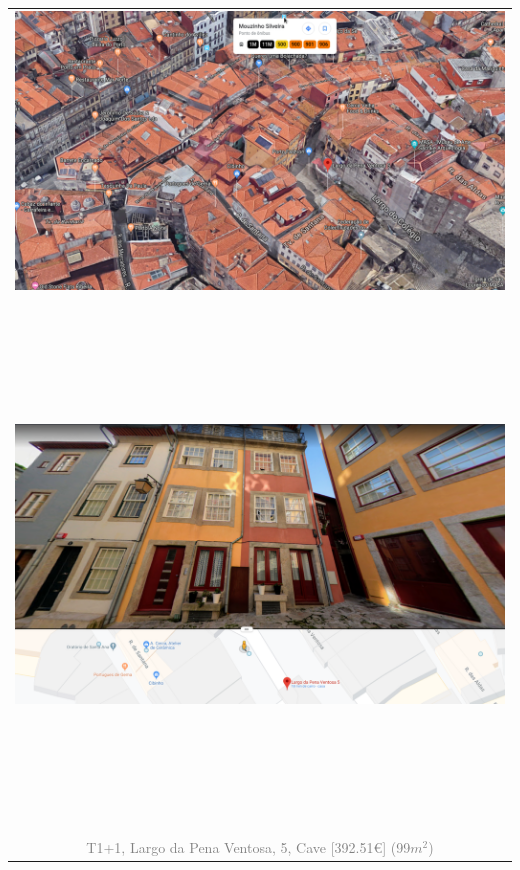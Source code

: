 \documentclass[]{report}
\begin{document}
\begin{table}[]
	\begin{center}
		\begin{huge}
			\begin{tabular}{c}
				\includegraphics[width=1\textwidth]{largo_da_pena_ventosa_5} \\
				~\\
				~\\
				~\\
				~\\
				~\\
				\includegraphics[width=1\textwidth]{largo_da_pena} \\
				~\\
				~\\
				~\\
				~\\
				~\\
				\textcolor{gray}{T1+1, Largo da Pena Ventosa, 5, Cave [392.51€] (99$m^{2}$)}
			\end{tabular}
		\end{huge}
	\end{center}
\end{table}
\end{document}
